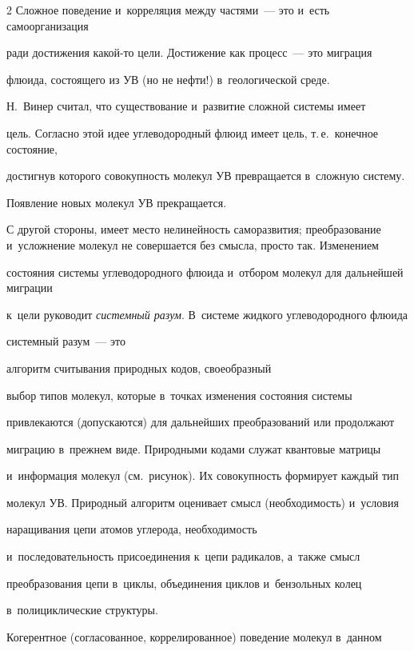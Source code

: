 \begin{multicols}{2}
Сложное поведение и~корреляция между частями~--- это и~есть самоорганизация 

ради достижения какой-то цели. Достижение как процесс~--- это миграция 

флюида, состоящего из УВ (но не нефти!) в~геологической среде. 

    

    Н.~Винер считал, что существование и~развитие сложной системы имеет 

цель. Согласно этой идее углеводородный флю\-ид имеет цель, т.\,е.\ конечное состояние, 

достигнув которого совокупность молекул УВ превращается в~сложную систему. 

Появление новых молекул УВ прекращается. 

    

    С другой стороны, имеет место нелинейность саморазвития; преобразование и~усложнение молекул не совершается без смысла, просто так. Изменением 

состояния системы углеводородного флю\-ида и~отбором молекул для дальнейшей миграции 

к~цели руководит \textit{системный разум}. В~системе жидкого углеводородного флю\-ида 

системный разум~--- это\linebreak

 алгоритм считывания природных кодов, своеобразный 

выбор типов молекул, которые в~точках изменения состояния сис\-те\-мы 

привлекаются (допускаются) для дальнейших преобразований или \mbox{продолжают} 

миграцию в~преж\-нем виде. Природными кодами служат квантовые мат\-ри\-цы 

и~информация молекул (см.\ рисунок). Их совокупность формирует каждый тип 

молекул УВ. Природный алгоритм оценивает смысл (необходимость) и~условия 

наращивания цепи атомов углерода,  необходимость 

и~последовательность присоединения к~цепи радикалов, а~также смысл 

преобразования цепи в~циклы, объединения циклов и~бензольных колец 

в~полициклические структуры.

    

    Когерентное (согласованное, коррелированное) поведение молекул в~данном 


\end{multicols}
